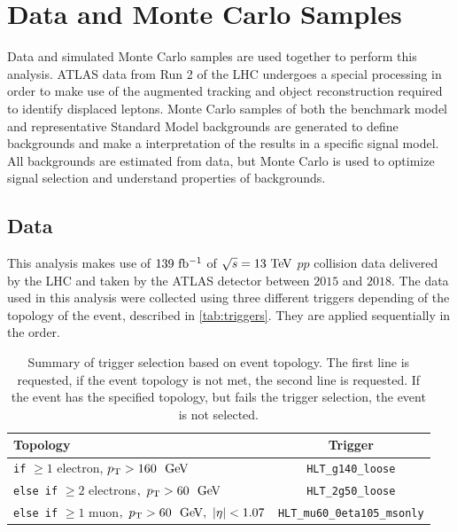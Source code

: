\chapter{Data and Monte Carlo Samples}
\label{chap:datamc}

Data and simulated Monte Carlo samples are used together to perform this analysis. ATLAS data from Run 2 of the LHC undergoes a special processing in order to make use of the augmented tracking and object reconstruction required to identify displaced leptons. Monte Carlo samples of both the benchmark model and representative Standard Model backgrounds are generated to define backgrounds and make a interpretation of the results in a specific signal model. All backgrounds are estimated from data, but Monte Carlo is used to optimize signal selection and understand properties of backgrounds.

\section{Data}
\label{sec:data}

This analysis makes use of $139~\mbox{fb\(^{-1}\)}$ of $\sqrt{s}=13\TeV$ $pp$ collision data delivered by the \ac{LHC} and taken by the \ac{ATLAS} detector between $2015$ and $2018$. The data used in this analysis were collected using three different triggers depending of the topology of the event, described in \autoref{tab:triggers}. They are applied sequentially in the order.

\begin{table}[htb]
\small
\begin{center}
\begin{tabular}{l|c}
Topology       & Trigger \\
\hline
\texttt{if} $\geq 1$ electron,$~\pt > 160~\gev$      & \texttt{HLT\_g140\_loose}    \\
\texttt{else if} $\geq 2$ electrons$,~\pt > 60~\gev$  & \texttt{HLT\_2g50\_loose} \\
\texttt{else if} $\geq 1$ muon$,~\pt > 60~\gev,~|\eta| < 1.07$                            & \texttt{HLT\_mu60\_0eta105\_msonly}   \\
\end{tabular}
\caption{Summary of trigger selection based on event topology. The first line is requested, if the event topology is not met, the second line is requested. If the event has the specified topology, but fails the trigger selection, the event is not selected.}
\label{tab:triggers}
\end{center}
\end{table}

